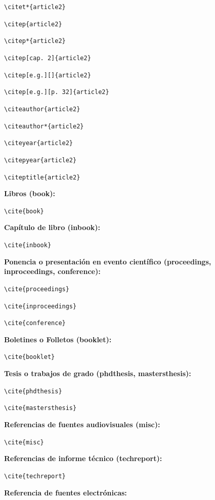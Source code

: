 \documentclass{uclamsc}
\begin{document}
\begin{contenido}
\verb;\citet*{article2}; \citet*{article2}

\verb;\citep{article2}; \citep{article2}

\verb;\citep*{article2}; \citep*{article2}

\verb;\citep[cap. 2]{article2}; \citep[cap. 2]{article2}

\verb;\citep[e.g.][]{article2}; \citep[e.g.][]{article2}

\verb;\citep[e.g.][p. 32]{article2}; \citep[e.g.][p. 32]{article2}

\verb;\citeauthor{article2}; \citeauthor{article2}

\verb;\citeauthor*{article2}; \citeauthor*{article2}

\verb;\citeyear{article2}; \citeyear{article2}

\verb;\citepyear{article2}; 

\verb;\citeptitle{article2}; 

\espaciodoble\textbf{Libros (book):}

\verb;\cite{book}; \cite{book}

\espaciodoble\textbf{Capítulo de libro (inbook):}

\verb;\cite{inbook}; \cite{inbook}

\espaciodoble\textbf{Ponencia o presentación en evento científico (proceedings, inproceedings, conference):}

\verb;\cite{proceedings}; \cite{proceedings}

\verb;\cite{inproceedings}; \cite{inproceedings}

\verb;\cite{conference}; \cite{conference}

\espaciodoble\textbf{Boletines o Folletos (booklet):}

\verb;\cite{booklet}; \cite{booklet}

\espaciodoble\textbf{Tesis o trabajos de grado (phdthesis, mastersthesis):}

\verb;\cite{phdthesis}; \cite{phdthesis}

\verb;\cite{mastersthesis}; \cite{mastersthesis}

\espaciodoble\textbf{Referencias de fuentes audiovisuales (misc):}

\verb;\cite{misc}; \cite{misc}

\espaciodoble\textbf{Referencias de informe técnico (techreport):}

\verb;\cite{techreport}; \cite{techreport}

\espaciodoble\textbf{Referencia de fuentes electrónicas:}


\end{contenido}
\end{document}
